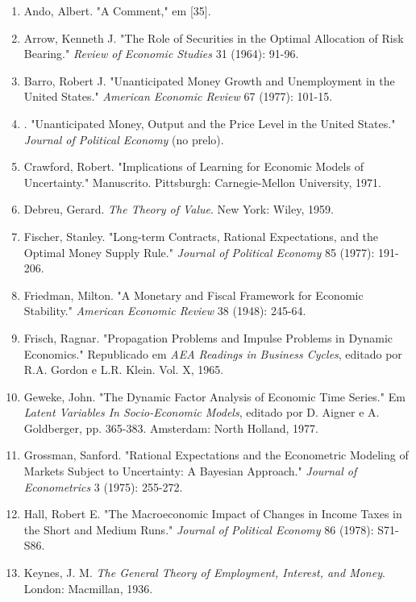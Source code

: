 \documentclass[12pt]{article}
\begin{document}
\begin{enumerate}
    \item[{[1]}] Ando, Albert. "A Comment," em [35].
    \item[{[2]}] Arrow, Kenneth J. "The Role of Securities in the Optimal Allocation of Risk Bearing." \textit{Review of Economic Studies} 31 (1964): 91-96.
    \item[{[3]}] Barro, Robert J. "Unanticipated Money Growth and Unemployment in the United States." \textit{American Economic Review} 67 (1977): 101-15.
    \item[{[4]}] \underline{\hspace{1cm}}. "Unanticipated Money, Output and the Price Level in the United States." \textit{Journal of Political Economy} (no prelo).
    \item[{[5]}] Crawford, Robert. "Implications of Learning for Economic Models of Uncertainty." Manuscrito. Pittsburgh: Carnegie-Mellon University, 1971.
    \item[{[6]}] Debreu, Gerard. \textit{The Theory of Value}. New York: Wiley, 1959.
    \item[{[7]}] Fischer, Stanley. "Long-term Contracts, Rational Expectations, and the Optimal Money Supply Rule." \textit{Journal of Political Economy} 85 (1977): 191-206.
    \item[{[8]}] Friedman, Milton. "A Monetary and Fiscal Framework for Economic Stability." \textit{American Economic Review} 38 (1948): 245-64.
    \item[{[9]}] Frisch, Ragnar. "Propagation Problems and Impulse Problems in Dynamic Economics." Republicado em \textit{AEA Readings in Business Cycles}, editado por R.A. Gordon e L.R. Klein. Vol. X, 1965.
    \item[{[10]}] Geweke, John. "The Dynamic Factor Analysis of Economic Time Series." Em \textit{Latent Variables In Socio-Economic Models}, editado por D. Aigner e A. Goldberger, pp. 365-383. Amsterdam: North Holland, 1977.
    \item[{[11]}] Grossman, Sanford. "Rational Expectations and the Econometric Modeling of Markets Subject to Uncertainty: A Bayesian Approach." \textit{Journal of Econometrics} 3 (1975): 255-272.
    \item[{[12]}] Hall, Robert E. "The Macroeconomic Impact of Changes in Income Taxes in the Short and Medium Runs." \textit{Journal of Political Economy} 86 (1978): S71-S86.
    \item[{[13]}] Keynes, J. M. \textit{The General Theory of Employment, Interest, and Money}. London: Macmillan, 1936.

\end{enumerate}
\end{document}
